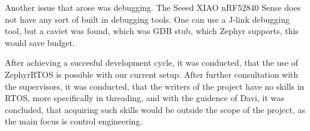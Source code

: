 Another issue that arose was debugging. The Seeed XIAO nRF52840 Sense does not have any sort of built in debugging tools. \cite{wikiSeeed}
One can use a J-link debugging tool, but a caviet was found, which was GDB stub, which Zephyr supports, this would save budget. \cite{docsZephyr}

After achieving a succesful development cycle, it was conducted, that the use of ZephyrRTOS is possible with our current setup.
After further consultation with the supervisors, it was conducted, that the writers of the project have no skills in RTOS, more specifically in threading, and with the guidence of Davi, it was concluded, that acquiring such skills would be outside the scope of the project, as the main focus is control engineering.